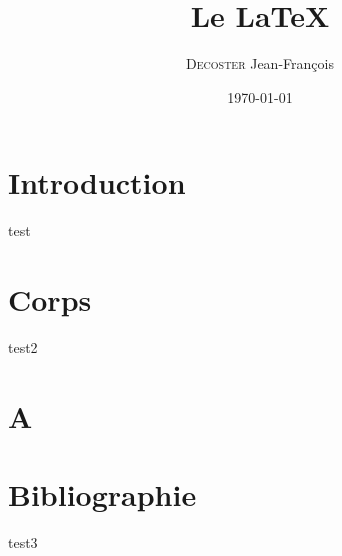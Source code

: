 \documentclass[a4paper]{book}
\title{Le \LaTeX}
\author{\textsc{Decoster} Jean-François}
\date\today
\begin{document}
	\maketitle
	\frontmatter
	\chapter{Introduction}
	test 
	\mainmatter
	\chapter{Corps}
	test2
	\appendix
	\chapter{A}
	\backmatter
	\chapter{Bibliographie}
	test3
\end{document}

